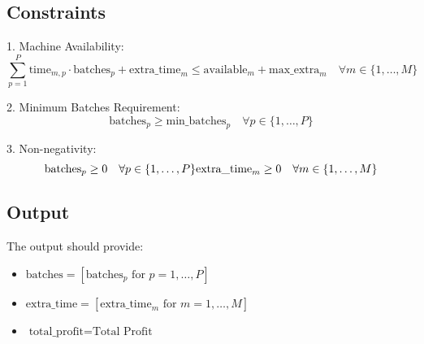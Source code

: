 \documentclass{article}
\begin{document}
\subsection*{Constraints}
1. Machine Availability:
\[
\sum_{p=1}^{P} \text{time}_{m,p} \cdot \text{batches}_{p} + \text{extra\_time}_{m} \leq \text{available}_{m} + \text{max\_extra}_{m} \quad \forall m \in \{1, \ldots, M\}
\]

2. Minimum Batches Requirement:
\[
\text{batches}_{p} \geq \text{min\_batches}_{p} \quad \forall p \in \{1, \ldots, P\}
\]

3. Non-negativity:
\[
\text{batches}_{p} \geq 0 \quad \forall p \in \{1, \ldots, P\} \\
\text{extra\_time}_{m} \geq 0 \quad \forall m \in \{1, \ldots, M\}
\]

\subsection*{Output}
The output should provide:
\begin{itemize}
    \item \( \text{batches} = [\text{batches}_{p} \text{ for } p = 1, \ldots, P] \)
    \item \( \text{extra\_time} = [\text{extra\_time}_{m} \text{ for } m = 1, \ldots, M] \)
    \item \( \text{total\_profit} = \text{Total Profit} \)
\end{itemize}
\end{document}
